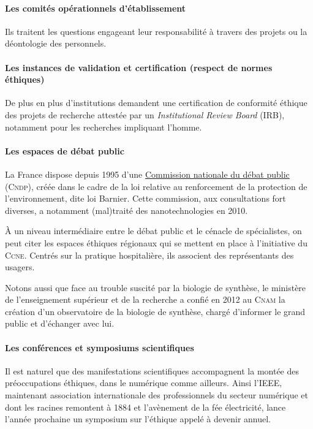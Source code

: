 \paragraph*{Les comités opérationnels d’établissement}
Ils trai\-tent les questions engageant leur responsabilité à travers des projets ou la déontologie des personnels.

\paragraph*{Les instances de validation et certification (respect de normes éthiques)}
De plus en plus d’institutions demandent une certification de conformité éthique des projets de recherche attestée par un \textit{Institutional Review Board} (IRB), notamment pour les recherches impliquant l’homme.

\paragraph*{Les espaces de débat public}
La France dispose depuis 1995 d’une \href{https://www.debatpublic.fr/}{Commission nationale du débat public} (\textsc{Cndp}), créée dans le cadre de la loi relative au renforcement de la protection de l’environnement, dite loi Barnier. Cette commission, aux consultations fort diverses, a notamment (mal)traité des nanotechnologies en 2010.

À un niveau intermédiaire entre le débat public et le cénacle de spécialistes, on peut citer les espaces éthiques régionaux qui se mettent en place à l’initiative du \textsc{Ccne}. Centrés sur la pratique hospitalière, ils associent des représentants des usagers.

Notons aussi que face au trouble suscité par la biologie de synthèse, le ministère de l’enseignement supérieur et de la recherche a confié en 2012 au \textsc{Cnam} la création d’un observatoire de la biologie de synthèse, chargé d’informer le grand public et d’échanger avec lui.

\paragraph*{Les conférences et symposiums scientifiques}
Il est naturel que des manifestations scientifiques accompagnent la montée des préoccupations éthiques, dans le numérique comme ailleurs. Ainsi l’IEEE, maintenant association internationale des professionnels du secteur numérique et dont les racines remontent à 1884 et l’avènement de la fée électricité, lance l’année prochaine un symposium sur l’éthique appelé à devenir annuel.

